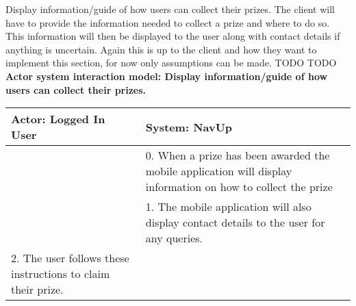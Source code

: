 \FuncReq
{Display information/guide of how users can collect their prizes.}
{The client will have to provide the information needed to collect a prize and where to do so. This information will then be displayed to the user along with contact details if anything is uncertain. Again this is up to the client and how they want to implement this section, for now only assumptions can be made.}
{TODO}
{TODO}
\\
\textbf{Actor system interaction model: Display information/guide of how users can collect their prizes.}\\
\begin{tabular}{ | p{6cm} | p{6cm} |}
\hline
Actor: Logged In User & System: NavUp \\ \hline
& 0. When a prize has been awarded the mobile application will display information on how to collect the prize\\ \hline
& 1. The mobile application will also display contact details to the user for any queries.\\ \hline
2. The user follows these instructions to claim their prize. &\\ \hline
\end{tabular}
\\
\bigskip